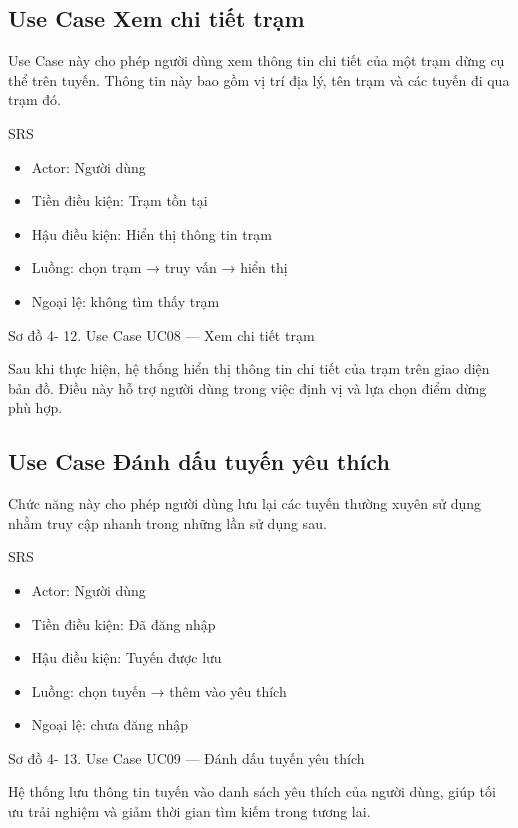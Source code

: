 \documentclass[13pt,a4paper]{report}
\begin{document}
\subsection{Use Case Xem chi tiết trạm}

Use Case này cho phép người dùng xem thông tin chi tiết của một trạm dừng cụ thể trên tuyến. Thông tin này bao gồm vị trí địa lý, tên trạm và các tuyến đi qua trạm đó.

SRS

\begin{itemize}
    \item Actor: Người dùng
    \item Tiền điều kiện: Trạm tồn tại
    \item Hậu điều kiện: Hiển thị thông tin trạm
    \item Luồng: chọn trạm → truy vấn → hiển thị
    \item Ngoại lệ: không tìm thấy trạm
\end{itemize}

Sơ đồ 4- 12. Use Case UC08 — Xem chi tiết trạm

Sau khi thực hiện, hệ thống hiển thị thông tin chi tiết của trạm trên giao diện bản đồ. Điều này hỗ trợ người dùng trong việc định vị và lựa chọn điểm dừng phù hợp.

\subsection{Use Case Đánh dấu tuyến yêu thích}

Chức năng này cho phép người dùng lưu lại các tuyến thường xuyên sử dụng nhằm truy cập nhanh trong những lần sử dụng sau.

SRS

\begin{itemize}
    \item Actor: Người dùng
    \item Tiền điều kiện: Đã đăng nhập
    \item Hậu điều kiện: Tuyến được lưu
    \item Luồng: chọn tuyến → thêm vào yêu thích
    \item Ngoại lệ: chưa đăng nhập
\end{itemize}

Sơ đồ 4- 13. Use Case UC09 — Đánh dấu tuyến yêu thích

Hệ thống lưu thông tin tuyến vào danh sách yêu thích của người dùng, giúp tối ưu trải nghiệm và giảm thời gian tìm kiếm trong tương lai.
\end{document}
